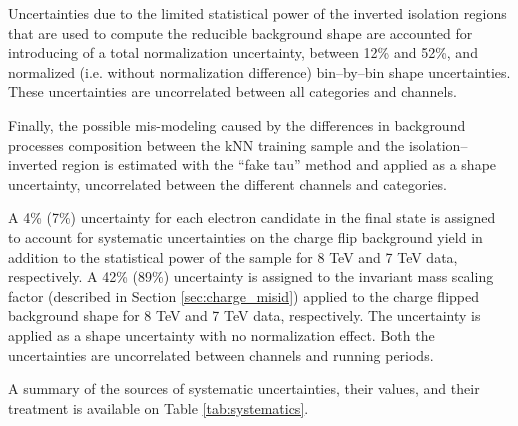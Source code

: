 Uncertainties due to the limited statistical power of the inverted isolation regions that are used to compute the reducible background shape are accounted for introducing of a total normalization uncertainty, between 12\% and 52\%, and normalized (i.e. without normalization difference) bin--by--bin shape uncertainties. These uncertainties are uncorrelated between all categories and channels.

Finally, the possible mis-modeling caused by the differences in background processes composition between the kNN training sample and the isolation--inverted region is estimated with the ``fake tau'' method and applied as a shape uncertainty, uncorrelated between the different channels and categories.

A 4\% (7\%) uncertainty for each electron candidate in the final state is assigned to account for systematic uncertainties on the charge flip background yield in addition to the statistical power of the sample for 8 TeV and 7 TeV data, respectively. A 42\% (89\%) uncertainty is assigned to the invariant mass scaling factor (described in Section \ref{sec:charge_misid}) applied to the charge flipped background shape for 8 TeV and 7 TeV data, respectively. The uncertainty is applied as a shape uncertainty with no normalization effect. Both the uncertainties are uncorrelated between channels and running periods. 

A summary of the sources of systematic uncertainties, their values, and their treatment is available on Table \ref{tab:systematics}.

